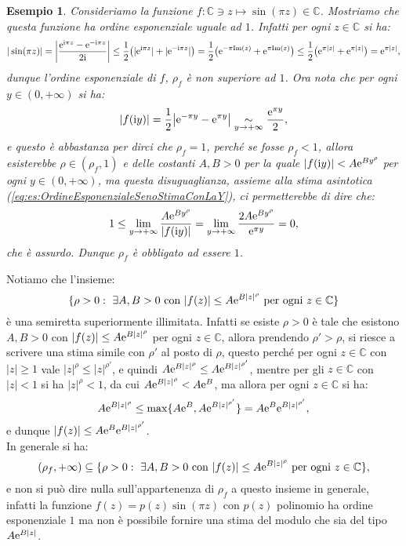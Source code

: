 \documentclass[11pt]{book}
\theoremstyle{Definizione}
\theoremstyle{TeoremaProposizioneLemmaCorollarioCongettura}
\theoremstyle{OsservazioneNotaEsempio}
\newtheorem{myes}{Esempio}[section]
\newcommand{\C}{\mathbb{C}}
\renewcommand{\Im}{\textup{Im}}
\renewcommand{\i}{\textup{i}}
\newcommand{\e}{\textup{e}}
\begin{document}
\begin{myes}\label{es:OrdineEsponenzialeSeno}
Consideriamo la funzione $f:\C \ni z \longmapsto \sin(\pi z)\in \C$. Mostriamo che questa funzione ha ordine esponenziale uguale ad $1$. Infatti per ogni $z\in \C$ si ha:
$$
|\sin(\pi z)| = \left|\frac{\e^{\i \pi z}-\e^{-\i\pi z}}{2\i}\right| \leq \frac{1}{2}\big(|\e^{\i\pi z}|+|\e^{-\i\pi z}|\big) = \frac{1}{2}\big(\e^{-\pi \Im(z)}+\e^{\pi \Im(z)}\big)\leq \frac{1}{2}\big(\e^{\pi |z|}+\e^{\pi |z|}\big) = \e^{\pi |z|},
$$
dunque l'ordine esponenziale di $f$, $\rho_f$ è non superiore ad $1$. Ora nota che per ogni $y\in (0,+\infty)$ si ha:
\begin{equation}\label{eq:es:OrdineEsponenzialeSenoStimaConLaY}
|f(\i y) | = \frac{1}{2}\big|\e^{-\pi y} - \e^{\pi y}\big|\underset{y\to+\infty}{\sim} \frac{\e^{\pi y}}{2},
\end{equation}
e questo è abbastanza per dirci che $\rho_f = 1$, perché se fosse $\rho_f < 1$, allora esisterebbe $\rho\in (\rho_f,1)$ e delle costanti $A,B > 0$ per la quale $|f(\i y)| < A \e^{B y^{\rho}}$ per ogni $y\in (0,+\infty)$, ma questa disuguaglianza, assieme alla stima asintotica (\ref{eq:es:OrdineEsponenzialeSenoStimaConLaY}), ci permetterebbe di dire che:
$$
1 \leq \lim_{y \to +\infty} \frac{A \e^{By^\rho}}{|f(\i y)|} = \lim_{y\to +\infty} \frac{2A \e^{B y^\rho}}{\e^{\pi y}} = 0,
$$
che è assurdo. Dunque $\rho_f$ è obbligato ad essere $1$.
\end{myes}
Notiamo che l'insieme:
$$
\{\rho > 0:\ \exists A,B > 0 \textup{ con }|f(z)| \leq A\e^{B|z|^\rho} \textup{ per ogni }z\in \C\}
$$
è una semiretta superiormente illimitata. Infatti se esiste $\rho > 0$ è tale che esistono $A,B > 0$ con $|f(z)|\leq A \e^{B|z|^\rho}$ per ogni $z\in \C$, allora prendendo $\rho'>\rho$, si riesce a scrivere una stima simile con $\rho'$ al posto di $\rho$, questo perché per ogni $z\in \C$ con $|z| \geq 1$ vale $|z|^\rho \leq |z|^{\rho'}$, e quindi $A \e^{B|z|^\rho}\leq A\e^{B|z|^{\rho'}}$, mentre per gli $z\in \C$ con $|z| < 1$ si ha $|z|^\rho < 1$, da cui $A\e^{B|z|^\rho}< A\e^{B}$, ma allora per ogni $z\in \C$ si ha:
$$
A\e^{B|z|^\rho} \leq \max\{A\e^{B},A\e^{B|z|^{\rho'}}\} = A\e^{B}\e^{B|z|^{\rho'}},
$$
e dunque $|f(z)|\leq A \e^{B}\e^{B|z|^{\rho'}}$.\\
In generale si ha:
$$
(\rho_f,+\infty) \subseteq \{\rho > 0:\ \exists A,B > 0 \textup{ con }|f(z)| \leq A\e^{B|z|^\rho} \textup{ per ogni }z\in \C\},
$$
e non si può dire nulla sull'appartenenza di $\rho_f$ a questo insieme in generale, infatti la funzione $f(z) = p(z)\sin(\pi z)$ con $p(z)$ polinomio ha ordine esponenziale $1$ ma non è possibile fornire una stima del modulo che sia del tipo $A\e^{B|z|}$.
\end{document}
